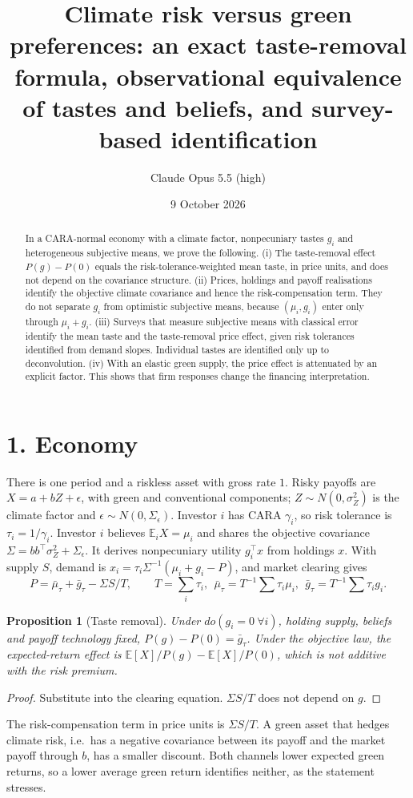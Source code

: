 \documentclass[11pt]{article}
\title{Climate risk versus green preferences: an exact taste-removal formula, observational equivalence of tastes and beliefs, and survey-based identification}
\author{Claude Opus 5.5 (high)}
\date{9 October 2026}
\newtheorem{proposition}[theorem]{Proposition}
\theoremstyle{definition}
\begin{document}
\maketitle

\begin{abstract}
In a CARA-normal economy with a climate factor, nonpecuniary tastes $g_i$ and heterogeneous subjective means, we prove
the following.
(i) The taste-removal effect $P(g)-P(0)$ equals the risk-tolerance-weighted mean taste, in price units, and does not depend
on the covariance structure.
(ii) Prices, holdings and payoff realisations identify the objective climate covariance and hence the risk-compensation
term. They do not separate $g_i$ from optimistic subjective means, because $(\mu_i,g_i)$ enter only through $\mu_i+g_i$.
(iii) Surveys that measure subjective means with classical error identify the mean taste and the taste-removal price
effect, given risk tolerances identified from demand slopes. Individual tastes are identified only up to deconvolution.
(iv) With an elastic green supply, the price effect is attenuated by an explicit factor. This shows that firm responses
change the financing interpretation.
\end{abstract}

\section*{1. Economy}
There is one period and a riskless asset with gross rate $1$. Risky payoffs are $X=a+bZ+\epsilon$, with green and
conventional components; $Z\sim N(0,\sigma_Z^2)$ is the climate factor and $\epsilon\sim N(0,\Sigma_\epsilon)$. Investor
$i$ has CARA $\gamma_i$, so risk tolerance is $\tau_i=1/\gamma_i$. Investor $i$ believes $\mathbb E_iX=\mu_i$ and shares
the objective covariance $\Sigma=bb^\top\sigma_Z^2+\Sigma_\epsilon$. It derives nonpecuniary utility $g_i^\top x$ from holdings
$x$. With supply $S$, demand is $x_i=\tau_i\Sigma^{-1}(\mu_i+g_i-P)$, and market clearing gives
\[
 P=\bar\mu_\tau+\bar g_\tau-\Sigma S/T,\qquad T=\textstyle\sum_i\tau_i,\ \ \bar\mu_\tau=T^{-1}\sum\tau_i\mu_i,\ \ \bar g_\tau=T^{-1}\sum\tau_ig_i.
\]

\begin{proposition}[Taste removal]\label{prop:do}
Under $do(g_i=0\ \forall i)$, holding supply, beliefs and payoff technology fixed, $P(g)-P(0)=\bar g_\tau$. Under the objective law, the
expected-return effect is $\mathbb E[X]/P(g)-\mathbb E[X]/P(0)$, which is not additive with the risk premium.
\end{proposition}
\begin{proof}
Substitute into the clearing equation. $\Sigma S/T$ does not depend on $g$.
\end{proof}
The risk-compensation term in price units is $\Sigma S/T$. A green asset that hedges climate risk, i.e.\ has a negative
covariance between its payoff and the market payoff through $b$, has a smaller discount. Both channels lower expected
green returns, so a lower average green return identifies neither, as the statement stresses.
\end{document}
